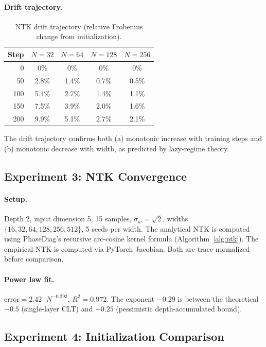 \documentclass[10pt]{article}
\theoremstyle{definition}
\begin{document}
\paragraph{Drift trajectory.}
\begin{table}[H]
\centering
\caption{NTK drift trajectory (relative Frobenius change from initialization).}
\begin{tabular}{rcccc}
\toprule
Step & $N=32$ & $N=64$ & $N=128$ & $N=256$ \\
\midrule
0   & 0\% & 0\% & 0\% & 0\% \\
50  & 2.8\% & 1.4\% & 0.7\% & 0.5\% \\
100 & 5.4\% & 2.7\% & 1.4\% & 1.1\% \\
150 & 7.5\% & 3.9\% & 2.0\% & 1.6\% \\
200 & 9.9\% & 5.1\% & 2.7\% & 2.1\% \\
\bottomrule
\end{tabular}
\end{table}

The drift trajectory confirms both (a) monotonic increase with training steps and (b) monotonic decrease with width, as predicted by lazy-regime theory.

\subsection{Experiment 3: NTK Convergence}

\paragraph{Setup.} Depth 2, input dimension 5, 15 samples, $\sigma_w = \sqrt{2}$, widths $\{16, 32, 64, 128, 256, 512\}$, 5 seeds per width.
The analytical NTK is computed using PhaseDiag's recursive arc-cosine kernel formula (Algorithm~\ref{alg:ntk}).
The empirical NTK is computed via PyTorch Jacobian.
Both are trace-normalized before comparison.

\paragraph{Power law fit.}
$\text{error} = 2.42 \cdot N^{-0.292}$, $R^2 = 0.972$.
The exponent $-0.29$ is between the theoretical $-0.5$ (single-layer CLT) and $-0.25$ (pessimistic depth-accumulated bound).

\subsection{Experiment 4: Initialization Comparison}
\end{document}
